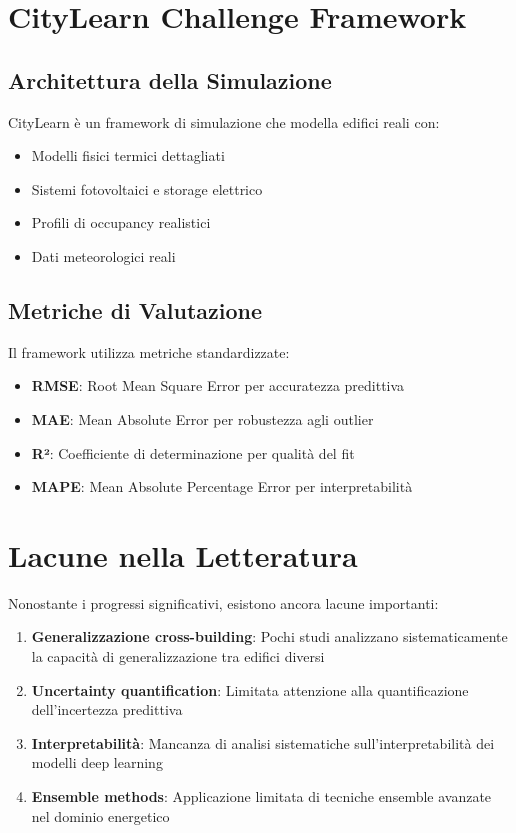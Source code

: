 \documentclass[12pt,a4paper,twoside]{report}
\begin{document}
\section{CityLearn Challenge Framework}

\subsection{Architettura della Simulazione}

CityLearn \cite{vazquez2020citylearn} è un framework di simulazione che modella edifici reali con:

\begin{itemize}
    \item Modelli fisici termici dettagliati
    \item Sistemi fotovoltaici e storage elettrico
    \item Profili di occupancy realistici
    \item Dati meteorologici reali
\end{itemize}

\subsection{Metriche di Valutazione}

Il framework utilizza metriche standardizzate:

\begin{itemize}
    \item \textbf{RMSE}: Root Mean Square Error per accuratezza predittiva
    \item \textbf{MAE}: Mean Absolute Error per robustezza agli outlier  
    \item \textbf{R²}: Coefficiente di determinazione per qualità del fit
    \item \textbf{MAPE}: Mean Absolute Percentage Error per interpretabilità
\end{itemize}

\section{Lacune nella Letteratura}

Nonostante i progressi significativi, esistono ancora lacune importanti:

\begin{enumerate}
    \item \textbf{Generalizzazione cross-building}: Pochi studi analizzano sistematicamente la capacità di generalizzazione tra edifici diversi
    
    \item \textbf{Uncertainty quantification}: Limitata attenzione alla quantificazione dell'incertezza predittiva
    
    \item \textbf{Interpretabilità}: Mancanza di analisi sistematiche sull'interpretabilità dei modelli deep learning
    
    \item \textbf{Ensemble methods}: Applicazione limitata di tecniche ensemble avanzate nel dominio energetico
\end{enumerate}
\end{document}
